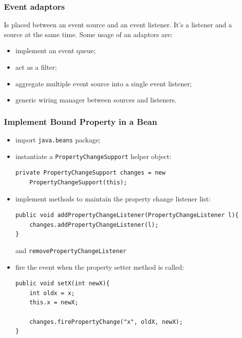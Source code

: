 \subsubsection{Event adaptors}
Is placed between an event source and an event listener.
It's a listener and a source at the same time.
Some usage of an adaptors are:
\begin{itemize}
    \item implement an event queue;
    \item act as a filter;
    \item aggregate multiple event source into a single event listener;
    \item generic wiring manager between sources and listeners.
\end{itemize}

\subsubsection{Implement Bound Property in a Bean}
\begin{itemize}
    \item import \verb|java.beans| package;

    \item instantiate a \verb|PropertyChangeSupport| helper object:
    \begin{verbatim}
private PropertyChangeSupport changes = new 
    PropertyChangeSupport(this);
    \end{verbatim}

    \item implement methods to maintain the property change listener list:
    \begin{verbatim}
public void addPropertyChangeListener(PropertyChangeListener l){
    changes.addPropertyChangeListener(l);
}
    \end{verbatim}
    and \verb|removePropertyChangeListener|
    
    \item fire the event when the property setter method is called:
    \begin{verbatim}
public void setX(int newX){
    int oldx = x;
    this.x = newX;
    
    changes.firePropertyChange("x", oldX, newX);
}
    \end{verbatim}
\end{itemize}

